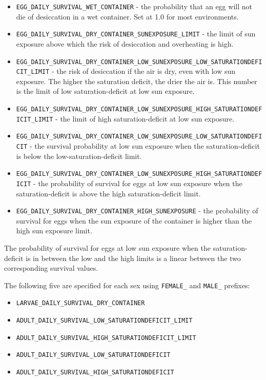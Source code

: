 \documentclass[11pt]{article}
\newcommand{\linecmd}[1]{\texttt{#1}}
\begin{document}
\begin{itemize}
	\item \linecmd{EGG\_DAILY\_SURVIVAL\_WET\_CONTAINER} - the probability that an egg will not die of desiccation in a wet container. Set at 1.0 for most environments.
	\item \linecmd{EGG\_DAILY\_SURVIVAL\_DRY\_CONTAINER\_SUNEXPOSURE\_LIMIT} - the limit of sun exposure above which the risk of desiccation and overheating is high.
	\item \linecmd{EGG\_DAILY\_SURVIVAL\_DRY\_CONTAINER\_LOW\_SUNEXPOSURE\_LOW\_SATURATIONDEFICIT\_LIMIT} - the risk of desiccation if the air is dry, even with low sun exposure. The higher the saturation deficit, the drier the air is. This number is the limit of low saturation-deficit at low sun exposure.
	\item \linecmd{EGG\_DAILY\_SURVIVAL\_DRY\_CONTAINER\_LOW\_SUNEXPOSURE\_HIGH\_SATURATIONDEFICIT\_LIMIT} - the limit of high saturation-deficit at low sun exposure. 
	\item \linecmd{EGG\_DAILY\_SURVIVAL\_DRY\_CONTAINER\_LOW\_SUNEXPOSURE\_LOW\_SATURATIONDEFICIT} - the survival probability at low sun exposure when the saturation-deficit is below the low-saturation-deficit limit.
	\item \linecmd{EGG\_DAILY\_SURVIVAL\_DRY\_CONTAINER\_LOW\_SUNEXPOSURE\_HIGH\_SATURATIONDEFICIT} - the probability of survival for eggs at low sun exposure when the saturation-deficit is above the high saturation-deficit limit.
	\item \linecmd{EGG\_DAILY\_SURVIVAL\_DRY\_CONTAINER\_HIGH\_SUNEXPOSURE} - the probability of survival for eggs when the sun exposure of the container is higher than the high sun exposure limit.
\end{itemize}

The probability of survival for eggs at low sun exposure when the saturation-deficit is in between the low and the high limits is a linear between the two corresponding survival values.

The following five are specified for each sex using \linecmd{FEMALE\_} and \linecmd{MALE\_} prefixes:
\begin{itemize}
	\item \linecmd{LARVAE\_DAILY\_SURVIVAL\_DRY\_CONTAINER}
	\item \linecmd{ADULT\_DAILY\_SURVIVAL\_LOW\_SATURATIONDEFICIT\_LIMIT}
	\item \linecmd{ADULT\_DAILY\_SURVIVAL\_HIGH\_SATURATIONDEFICIT\_LIMIT}
	\item \linecmd{ADULT\_DAILY\_SURVIVAL\_LOW\_SATURATIONDEFICIT}
	\item \linecmd{ADULT\_DAILY\_SURVIVAL\_HIGH\_SATURATIONDEFICIT}
\end{itemize}
\end{document}
